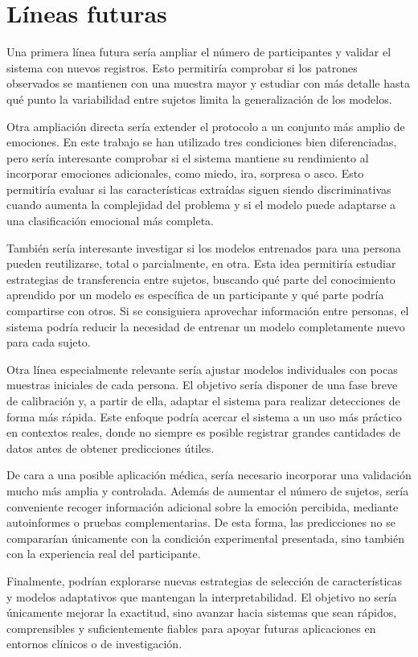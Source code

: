 \section{Líneas futuras}

Una primera línea futura sería ampliar el número de participantes y validar el sistema con nuevos registros. Esto permitiría comprobar si los patrones observados se mantienen con una muestra mayor y estudiar con más detalle hasta qué punto la variabilidad entre sujetos limita la generalización de los modelos.

Otra ampliación directa sería extender el protocolo a un conjunto más amplio de emociones. En este trabajo se han utilizado tres condiciones bien diferenciadas, pero sería interesante comprobar si el sistema mantiene su rendimiento al incorporar emociones adicionales, como miedo, ira, sorpresa o asco. Esto permitiría evaluar si las características extraídas siguen siendo discriminativas cuando aumenta la complejidad del problema y si el modelo puede adaptarse a una clasificación emocional más completa.

También sería interesante investigar si los modelos entrenados para una persona pueden reutilizarse, total o parcialmente, en otra. Esta idea permitiría estudiar estrategias de transferencia entre sujetos, buscando qué parte del conocimiento aprendido por un modelo es específica de un participante y qué parte podría compartirse con otros. Si se consiguiera aprovechar información entre personas, el sistema podría reducir la necesidad de entrenar un modelo completamente nuevo para cada sujeto.

Otra línea especialmente relevante sería ajustar modelos individuales con pocas muestras iniciales de cada persona. El objetivo sería disponer de una fase breve de calibración y, a partir de ella, adaptar el sistema para realizar detecciones de forma más rápida. Este enfoque podría acercar el sistema a un uso más práctico en contextos reales, donde no siempre es posible registrar grandes cantidades de datos antes de obtener predicciones útiles.

De cara a una posible aplicación médica, sería necesario incorporar una validación mucho más amplia y controlada. Además de aumentar el número de sujetos, sería conveniente recoger información adicional sobre la emoción percibida, mediante autoinformes o pruebas complementarias. De esta forma, las predicciones no se compararían únicamente con la condición experimental presentada, sino también con la experiencia real del participante.

Finalmente, podrían explorarse nuevas estrategias de selección de características y modelos adaptativos que mantengan la interpretabilidad. El objetivo no sería únicamente mejorar la exactitud, sino avanzar hacia sistemas que sean rápidos, comprensibles y suficientemente fiables para apoyar futuras aplicaciones en entornos clínicos o de investigación.
